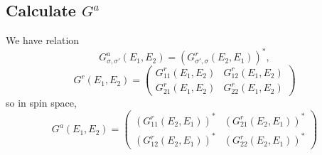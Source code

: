 \documentclass[11pt,a4paper]{article}
\begin{document}
\subsection{Calculate $G^{a}$}
We have relation
\begin{equation}
G_{\sigma,\sigma'}^{a}\left(E_{1}, E_{2}\right)=(G_{\sigma',\sigma}^{r}\left(E_{2}, E_{1}\right))^{*},
\end{equation}
\begin{equation}
G^{r}(E_{1},E_{2})=\left(\begin{array}{cc}
G_{11}^{r}(E_{1},E_{2}) & G_{12}^{r}(E_{1},E_{2}) \\
G_{21}^{r}(E_{1},E_{2}) & G_{22}^{r}(E_{1},E_{2})
\end{array}\right)
\end{equation}
so in spin space, 
\begin{equation}
G^{a}(E_{1},E_{2})=\left(\begin{array}{cc}
(G_{11}^{r}(E_{2},E_{1}))^{*} & (G_{21}^{r}(E_{2},E_{1}))^{*} \\
(G_{12}^{r}(E_{2},E_{1}))^{*} & (G_{22}^{r}(E_{2},E_{1}))^{*}
\end{array}\right)
\end{equation}
\end{document}
